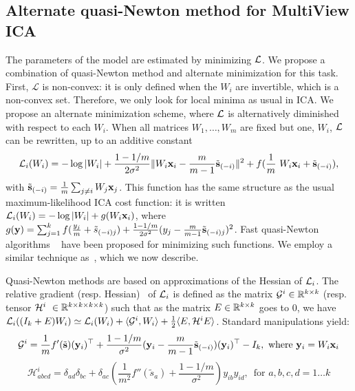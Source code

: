 \documentclass{report}
\begin{document}
{\subsection{Alternate quasi-Newton method for MultiView ICA}
%
The parameters of the model are estimated by minimizing $\mathcal{L}$.
%
We propose a combination of quasi-Newton method and alternate minimization for this task.
%
First, $\mathcal{L}$ is non-convex: it is only defined when the $W_i$ are invertible, which is a non-convex set.
%
Therefore, we only look for local minima as usual in ICA.
%
We propose an alternate minimization scheme, where $\mathcal{L}$ is alternatively diminished with respect to each $W_i$. 
%
When all matrices $W_1, \dots, W_m$ are fixed but one, $W_i$, $\mathcal{L}$ can be rewritten, up to an additive constant 
\begin{equation}
    \label{eq:indiv_loss}
  \loss_i(W_i) = -\log|W_i| + \frac{1 - 1/m}{2\sigma^2}\|W_i\xb_i - \frac{m}{m-1}\tilde{\sbb}_{(-i)}\|^2 + f(\frac1m W_i \xb_i +\tilde{\sbb}_{(-i)}), 
\end{equation}
with $\tilde{\mathbf{s}}_{(-i)} = \frac1m \sum_{j \neq i}W_j \mathbf{x}_j$.
%
This function has the same structure as the usual maximum-likelihood ICA cost function: it is written $\mathcal{L}_i(W_i) = -\log|W_i| + g(W_i\mathbf{x}_i)$, where $g(\mathbf{y}) = \sum_{j=1}^kf(\frac{y_j}{m} + \tilde{s}_{(-i)j}) + \frac{1 - 1/m}{2\sigma^2}(y_j - \frac{m}{m-1}\tilde{\mathbf{s}}_{(-i)j})^2$.
%
Fast quasi-Newton algorithms ~\cite{zibulevsky2003blind, ablin2018faster} have been proposed for minimizing such functions.
%
We employ a similar technique as~\cite{zibulevsky2003blind}, which we now describe.

Quasi-Newton methods are based on approximations of the Hessian of $\mathcal{L}_i$.
%
The relative gradient (resp. Hessian)~\cite{amari1996new, cardoso1996equivariant} of $\mathcal{L}_i$ is defined as the matrix $\mathcal{G}^i\in \mathbb{R}^{k \times k}$ (resp. tensor $\mathcal{H}^i \in \bbR^{k\times k\times k\times k}$) such that as the matrix $E\in\mathbb{R}^{k\times k}$ goes to $0$, we have $\mathcal{L}_i((I_k + E)W_i) \simeq \mathcal{L}_i(W_i) + \langle \mathcal{G}^i, W_i\rangle + \frac12\langle E, \mathcal{H}^iE\rangle$. Standard manipulations yield:
\begin{equation}
    \label{eq:gradient}
    \mathcal{G}^i = \frac1mf'(\tilde{\mathbf{s}})(\mathbf{y}_i)^{\top} + \frac{1 - 1 /m}{\sigma^2}(\mathbf{y}_i - \frac{m}{m-1}\tilde{\mathbf{s}}_{(-i)})(\mathbf{y}_i)^{\top} - I_k, \text{ where } \mathbf{y}_i= W_i\mathbf{x}_i
\end{equation}
\begin{equation}
    \label{eq:hessian}
    \mathcal{H}^i_{abcd} = \delta_{ad}\delta_{bc} + \delta_{ac}\left(\frac{1}{m^2}f''(\tilde{s}_a) + \frac{1 - 1/m}{\sigma^2}\right)y_{ib}y_{id},\enspace \text{for }a, b, c, d =1\dots k
\end{equation}

}
\end{document}
